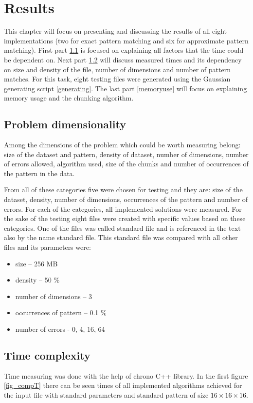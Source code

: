 \chapter{Results} \label{results}
This chapter will focus on presenting and discussing the results of all eight implementations (two for exact pattern matching and six for approximate pattern matching). First part \ref{problemdim} is focused on explaining all factors that the time could be dependent on. Next part \ref{timecomplex} will discuss measured times and its dependency on size and density of the file, number of dimensions and number of pattern matches. For this task, eight testing files were generated using the Gaussian generating script \ref{generating}. The last part \ref{memoryuse} will focus on explaining memory usage and the chunking algorithm.

\section{Problem dimensionality} \label{problemdim}
Among the dimensions of the problem which could be worth measuring belong: size of the dataset and pattern, density of dataset, number of dimensions, number of errors allowed, algorithm used, size of the chunks and number of occurrences of the pattern in the data.

From all of these categories five were chosen for testing and they are: size of the dataset, density, number of dimensions, occurrences of the pattern and number of errors. For each of the categories, all implemented solutions were measured. For the sake of the testing eight files were created with specific values based on these categories. One of the files was called standard file and is referenced in the text also by the name standard file. This standard file was compared with all other files and its parameters were: 
\begin{itemize}
\item size -- 256 MB
\item density -- 50 \%
\item number of dimensions -- 3
\item occurrences of pattern -- 0.1 \%
\item number of errors - 0, 4, 16, 64
\end{itemize}

\section{Time complexity} \label{timecomplex}
Time measuring was done with the help of chrono C++ library. In the first figure \ref{fig_compT} there can be seen times of all implemented algorithms achieved for the input file with standard parameters and standard pattern of size $16\times16\times16$. 

